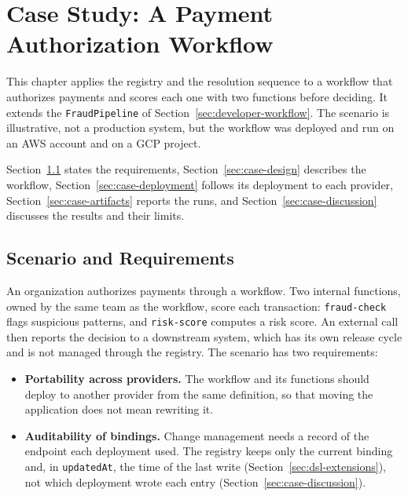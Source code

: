 %
%
%
\chapter{Case Study: A Payment Authorization Workflow}
\label{cha:case-study}

This chapter applies the registry and the resolution sequence to a workflow that authorizes
payments and scores each one with two functions before deciding. It extends the
\texttt{FraudPipeline} of Section~\ref{sec:developer-workflow}. The scenario is illustrative, not a
production system, but the workflow was deployed and run on an AWS account and on a GCP project.

Section~\ref{sec:case-scenario} states the requirements, Section~\ref{sec:case-design} describes the
workflow, Section~\ref{sec:case-deployment} follows its deployment to each provider,
Section~\ref{sec:case-artifacts} reports the runs, and Section~\ref{sec:case-discussion} discusses
the results and their limits.

\section{Scenario and Requirements}
\label{sec:case-scenario}

An organization authorizes payments through a workflow. Two internal functions, owned by the
same team as the workflow, score each transaction: \texttt{fraud-check} flags suspicious patterns,
and \texttt{risk-score} computes a risk score. An external call then reports the decision to a
downstream system, which has its own release cycle and is not managed through the registry. The
scenario has two requirements:

\begin{itemize}
    \item \textbf{Portability across providers.} The workflow and its functions should deploy to
    another provider from the same definition, so that moving the application does not mean
    rewriting it.
    \item \textbf{Auditability of bindings.} Change management needs a record of the endpoint each
    deployment used. The registry keeps only the current binding and, in \texttt{updatedAt}, the
    time of the last write (Section~\ref{sec:dsl-extensions}), not which deployment wrote each
    entry (Section~\ref{sec:case-discussion}).
\end{itemize}

